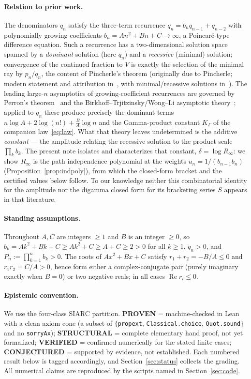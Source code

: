 \documentclass[11pt]{article}
\newcommand{\Rinf}{R_\infty}
\begin{document}
\paragraph{Relation to prior work.}
The denominators $q_n$ satisfy the three-term recurrence $q_n=b_nq_{n-1}+q_{n-2}$
with polynomially growing coefficients $b_n=An^2+Bn+C\to\infty$, a Poincar\'e-type
difference equation. Such a recurrence has a two-dimensional solution space spanned
by a \emph{dominant} solution (here $q_n$) and a \emph{recessive} (minimal) solution;
convergence of the continued fraction to $V$ is exactly the selection of the minimal
ray by $p_n/q_n$, the content of Pincherle's theorem (originally due to Pincherle;
modern statement and attribution in~\cite{gautschi}, with minimal/recessive solutions
in~\cite[\S3.6]{dlmf}). The leading large-$n$ asymptotics of growing-coefficient
recurrences are governed by Perron's theorem~\cite{perron} and the
Birkhoff--Trjitzinsky/Wong--Li asymptotic theory~\cite{bt,wongli}; applied to $q_n$
these produce precisely the dominant terms $n\log A+2\log(n!)+\tfrac{B}{A}\log n$ and
the Gamma-product constant $K_\Gamma$ of the companion law~\eqref{eq:law}. What that
theory leaves undetermined is the additive \emph{constant} --- the amplitude relating
the recessive solution to the product scale $\prod_kb_k$. The present note isolates
and characterizes that constant, $\delta=\log\Rinf$: we show $\Rinf$ is the path
independence polynomial at the weights $u_n=1/(b_{n-1}b_n)$
(Proposition~\ref{prop:indpoly}), from which the closed-form bracket and the certified
values below follow. To our knowledge neither this combinatorial identity for the
amplitude nor the digamma closed form for its bracketing series $S$ appears in that
literature.

\paragraph{Standing assumptions.}
Throughout $A,C$ are integers $\ge1$ and $B$ is an integer $\ge0$, so
$b_k=Ak^2+Bk+C\ge Ak^2+C\ge A+C\ge2>0$ for all $k\ge1$, $q_n>0$, and
$P_n:=\prod_{k=1}^nb_k>0$. The roots of $Ax^2+Bx+C$ satisfy $r_1+r_2=-B/A\le0$ and
$r_1r_2=C/A>0$, hence form either a complex-conjugate pair (purely imaginary exactly
when $B=0$) or two negative reals; in all cases $\operatorname{Re}r_i\le0$.

\paragraph{Epistemic convention.}
We use the four-class SIARC partition. \textbf{PROVEN} = machine-checked in Lean
with a clean axiom cone (a subset of $\{$\texttt{propext}, \texttt{Classical.choice},
\texttt{Quot.sound}$\}$ and no
\texttt{sorryAx}); \textbf{STRUCTURAL} = complete elementary hand proof, not yet
formalized; \textbf{VERIFIED} = confirmed numerically for the stated finite cases;
\textbf{CONJECTURED} = supported by evidence, not established. Each numbered result
below is tagged accordingly, and Section~\ref{sec:status} collects the grading. All
numerical claims are reproduced by the scripts named in Section~\ref{sec:code}.
\end{document}
